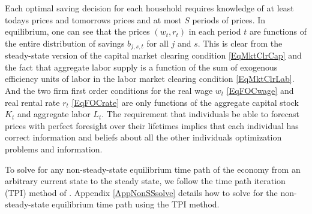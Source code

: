 \documentclass[letterpaper,12pt]{article}
\theoremstyle{definition}
\begin{document}
\begin{spacing}{1.5}
    Each optimal saving decision for each household requires knowledge of at least todays prices and tomorrows prices and at most $S$ periods of prices. In equilibrium, one can see that the prices $(w_t,r_t)$ in each period $t$ are functions of the entire distribution of savings $b_{j,s,t}$ for all $j$ and $s$. This is clear from the steady-state version of the capital market clearing condition \eqref{EqMktClrCap} and the fact that aggregate labor supply is a function of the sum of exogenous efficiency units of labor in the labor market clearing condition \eqref{EqMktClrLab}. And the two firm first order conditions for the real wage $w_t$ \eqref{EqFOCwage} and real rental rate $r_t$ \eqref{EqFOCrate} are only functions of the aggregate capital stock $K_t$ and aggregate labor $L_t$. The requirement that individuals be able to forecast prices with perfect foresight over their lifetimes implies that each individual has correct information and beliefs about all the other individuals optimization problems and information.

    To solve for any non-steady-state equilibrium time path of the economy from an arbitrary current state to the steady state, we follow the time path iteration (TPI) method of \citet{AuerbachKotlikoff:1987}. Appendix \ref{AppNonSSsolve} details how to solve for the non-steady-state equilibrium time path using the TPI method.









\end{spacing}
\end{document}
